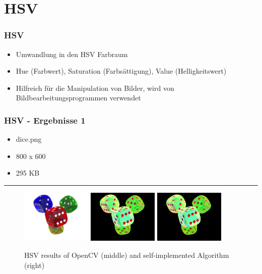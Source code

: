 \section{HSV}

\begin{frame}
    \frametitle{HSV}

    \begin{itemize}
        \item Umwandlung in den HSV Farbraum \pause
        \item Hue (Farbwert), Saturation (Farbsättigung), Value (Helligkeitswert) \pause
        \item Hilfreich für die Manipulation von Bilder, wird von Bildbearbeitungsprogrammen verwendet \pause
    \end{itemize}
\end{frame}

\begin{frame}
    \frametitle{HSV - Ergebnisse 1}

    \begin{itemize}
        \item dice.png
        \item 800 x 600
        \item 295 KB
    \end{itemize}

    \hfill
    \hrule
    \hfill

    \begin{figure}[H]
        \centering
    
        \includegraphics[width=0.30\textwidth]{images/dice.png}
        \includegraphics[width=0.30\textwidth]{images/results/hsv-cv.dice.png}
        \includegraphics[width=0.30\textwidth]{images/results/hsv-my.dice.png}

        
        \begin{center}
            \caption{HSV results of OpenCV (middle) and self-implemented  Algorithm (right)}            
        \end{center}

        \label{fig:hsv1}
    \end{figure}
\end{frame}


